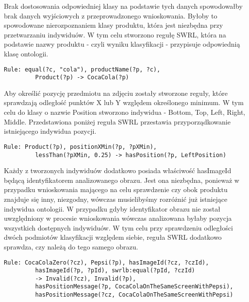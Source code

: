 \begin{itemize}
Brak dostosowania odpowiedniej klasy na podstawie tych danych spowodowałby brak danych wyjściowych z przeprowadzonego wnioskowania. Byłoby to spowodowane nierozpoznaniem klasy produktu, która jest niezbędna przy przetwarzaniu indywiduów. W tym celu stworzono regułę SWRL, która na podstawie nazwy produktu - czyli wyniku klasyfikacji - przypisuje odpowiednią klasę ontologii. 

\begin{lstlisting}[caption={Przypisanie klasy do indywiduum.}]
 Rule: equal(?c, "cola"), productName(?p, ?c), 
		 Product(?p) -> CocaCola(?p)
\end{lstlisting}

Aby określić pozycję przedmiotu na zdjęciu zostały stworzone reguły, które sprawdzają odległość punktów X lub Y względem określonego minimum. W tym celu do klasy o nazwie Position stworzono indywidua - Bottom, Top, Left, Right, Middle. Przedstawiona poniżej reguła SWRL przestawia przyporządkowanie istniejącego indywidua pozycji.

\begin{lstlisting}[caption={Przypisanie pozycji LeftPosition do indywidua na podstawie właściwości XMin.}]
Rule: Product(?p), positionXMin(?p, ?pXMin), 
		 lessThan(?pXMin, 0.25) -> hasPosition(?p, LeftPosition)
\end{lstlisting}

Każdy z tworzonych indywiduów dodatkowo posiada właściwość hasImageId będącą identyfikatorem analizowanego obrazu. Jest ona niezbędna, ponieważ w przypadku wnioskowania mającego na celu sprawdzenie czy obok produktu znajduje się inny, niezgodny, wówczas musielibyśmy rozróżnić już istniejące indywidua ontologii. W przypadku gdyby identyfikator obrazu nie został uwzględniony w procesie wnioskowania wówczas analizowana byłaby pozycja wszystkich dostępnych indywiduów. W tym celu przy sprawdzeniu odległości dwóch podmiotów klasyfikacji względem siebie, reguła SWRL dodatkowo sprawdza, czy należą do tego samego obrazu.

\begin{lstlisting}[caption={Reguła sprawdzająca czy indywidua klas Pepsi oraz CocaColaZero znajdują się na tym samym obrazie.}]
Rule: CocaColaZero(?cz), Pepsi(?p), hasImageId(?cz, ?czId), 
		 hasImageId(?p, ?pId), swrlb:equal(?pId, ?czId) 
		 -> Invalid(?cz), Invalid(?p), 
		 hasPositionMessage(?p, CocaColaOnTheSameScreenWithPepsi),
		 hasPositionMessage(?cz, CocaColaOnTheSameScreenWithPepsi)
\end{lstlisting}


\end{itemize}
